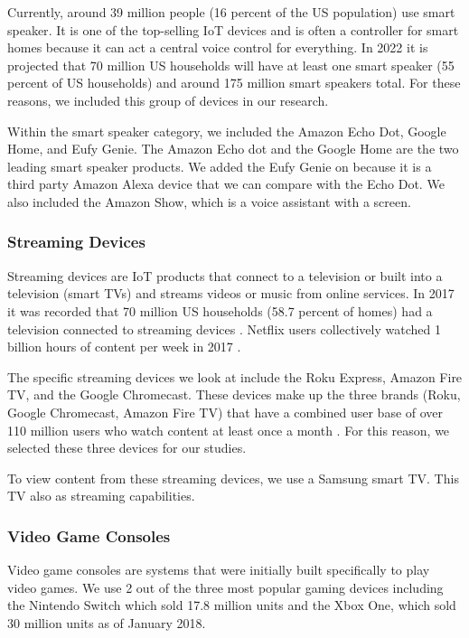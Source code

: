 Currently, around 39 million people (16 percent of the US population) use smart speaker\cite{perez_2017}. It is one of the top-selling IoT devices and is often a controller for smart homes because it can act a central voice control for everything. In 2022 it is projected that 70 million US households will have at least one smart speaker (55 percent of US households) and around 175 million smart speakers total\cite{perez_2018}. For these reasons, we included this group of devices in our research.

Within the smart speaker category, we included the Amazon Echo Dot, Google Home, and Eufy Genie. The Amazon Echo dot and the Google Home are the two leading smart speaker products. We added the Eufy Genie on because it is a third party Amazon Alexa device that we can compare with the Echo Dot. We also included the Amazon Show, which is a voice assistant with a screen.

\subsubsection{Streaming Devices}

Streaming devices are IoT products that connect to a television or built into a television (smart TVs) and streams videos or music from online services. In 2017 it was recorded that 70 million US households (58.7 percent of homes) had a television connected to streaming devices \cite{lynch_2017}. Netflix users collectively watched 1 billion hours of content per week in 2017 \cite{matney_2017}.

The specific streaming devices we look at include the Roku Express, Amazon Fire TV, and the Google Chromecast. These devices make up the three brands (Roku, Google Chromecast, Amazon Fire TV) that have a combined user base of over 110 million users who watch content at least once a month \cite{emarketer_2017}. For this reason, we selected these three devices for our studies.

To view content from these streaming devices, we use a Samsung smart TV. This TV also as streaming capabilities.

\subsubsection{Video Game Consoles}

Video game consoles are systems that were initially built specifically to play video games. We use 2 out of the three most popular gaming devices including the Nintendo Switch which sold 17.8 million units \cite{nintendo} and the Xbox One, which sold 30 million units \cite{souppouris_2016} as of January 2018.

